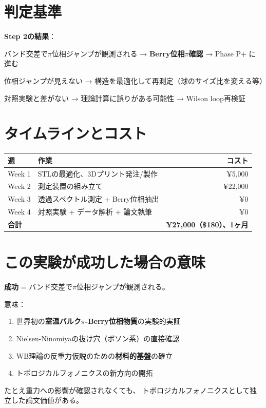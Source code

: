 \documentclass[11pt,a4paper]{article}
\begin{document}
\section{判定基準}

\begin{tcolorbox}[colback=red!5,colframe=red!60!black,title=GO/STOP 判定]
\textbf{Step 2の結果}：

バンド交差で$\pi$位相ジャンプが観測される
→ \textbf{Berry位相$\pi$確認} → Phase P+ に進む

位相ジャンプが見えない
→ 構造を最適化して再測定（球のサイズ比を変える等）

対照実験と差がない
→ 理論計算に誤りがある可能性 → Wilson loop再検証
\end{tcolorbox}

\section{タイムラインとコスト}

\begin{center}
\begin{tabular}{llr}
\toprule
週 & 作業 & コスト \\
\midrule
Week 1 & STLの最適化、3Dプリント発注/製作 & ¥5,000 \\
Week 2 & 測定装置の組み立て & ¥22,000 \\
Week 3 & 透過スペクトル測定 + Berry位相抽出 & ¥0 \\
Week 4 & 対照実験 + データ解析 + 論文執筆 & ¥0 \\
\midrule
\textbf{合計} & & \textbf{¥27,000（\$180）、1ヶ月} \\
\bottomrule
\end{tabular}
\end{center}

\section{この実験が成功した場合の意味}

\begin{tcolorbox}[colback=green!5,colframe=green!60!black]
\textbf{成功} = バンド交差で$\pi$位相ジャンプが観測される。

意味：
\begin{enumerate}
\item 世界初の\textbf{室温バルク$\pi$-Berry位相物質}の実験的実証
\item Nielsen-Ninomiyaの抜け穴（ボソン系）の直接確認
\item WB理論の反重力仮説のための\textbf{材料的基盤}の確立
\item トポロジカルフォノニクスの新方向の開拓
\end{enumerate}

たとえ重力への影響が確認されなくても、
トポロジカルフォノニクスとして独立した論文価値がある。
\end{tcolorbox}
\end{document}
